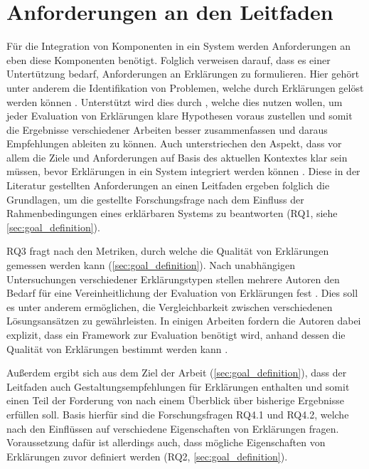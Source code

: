 \section{Anforderungen an den Leitfaden}

Für die Integration von Komponenten in ein System werden Anforderungen an eben diese Komponenten benötigt. Folglich verweisen \citeauthor{chazette_end-users_nodate, doshi2017towards} darauf, dass es einer Untertützung bedarf, Anforderungen an Erklärungen zu formulieren. Hier gehört unter anderem die Identifikation von Problemen, welche durch Erklärungen gelöst werden können \cite{chazette_end-users_nodate, doshi2017towards}. Unterstützt wird dies durch \citeauthor{waa_evaluating_2021}, welche dies nutzen wollen, um jeder Evaluation von Erklärungen klare Hypothesen voraus zustellen und somit die Ergebnisse verschiedener Arbeiten besser zusammenfassen und daraus Empfehlungen ableiten zu können. Auch \citeauthor{kohl_explainability_2019} unterstriechen den Aspekt, dass vor allem die Ziele und Anforderungen auf Basis des aktuellen Kontextes klar sein müssen, bevor Erklärungen in ein System integriert werden können \cite{kohl_explainability_2019}. Diese in der Literatur gestellten Anforderungen an einen Leitfaden ergeben folglich die Grundlagen, um die gestellte Forschungsfrage nach dem Einfluss der Rahmenbedingungen eines erklärbaren Systems zu beantworten (RQ1, siehe \autoref{sec:goal_definition}).

RQ3 fragt nach den Metriken, durch welche die Qualität von Erklärungen gemessen werden kann (\autoref{sec:goal_definition}). Nach unabhängigen Untersuchungen verschiedener Erklärungstypen stellen mehrere Autoren den Bedarf für eine Vereinheitlichung der Evaluation von Erklärungen fest \cite{cirqueira_scenario-based_2020,zahedi_towards_2019, nunes_systematic_2017, martin_evaluating_2021}. Dies soll es unter anderem ermöglichen, die Vergleichbarkeit zwischen verschiedenen Lösungsansätzen zu gewährleisten. In einigen Arbeiten fordern die Autoren dabei explizit, dass ein Framework zur Evaluation benötigt wird, anhand dessen die Qualität von Erklärungen bestimmt werden kann \cite{nunes_systematic_2017,sokol_explainability_2020,chari_explanation_2020}.

Außerdem ergibt sich aus dem Ziel der Arbeit (\autoref{sec:goal_definition}), dass der Leitfaden auch Gestaltungsempfehlungen für Erklärungen enthalten und somit einen Teil der Forderung von \citeauthor{waa_evaluating_2021} nach einem Überblick über bisherige Ergebnisse erfüllen soll. Basis hierfür sind die Forschungsfragen RQ4.1 und RQ4.2, welche nach den Einflüssen auf verschiedene Eigenschaften von Erklärungen fragen. Voraussetzung dafür ist allerdings auch, dass mögliche Eigenschaften von Erklärungen zuvor definiert werden (RQ2, \autoref{sec:goal_definition}).

